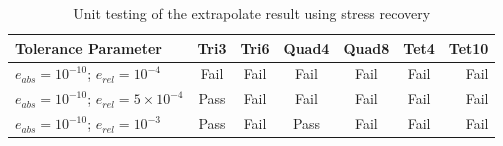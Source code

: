\begin{table} 		
	\caption{Unit testing of the extrapolate result using stress recovery}
	\label{tab: SRTesting}
	\begin{tabular}{l*{5}{c}r} 
		
		Tolerance Parameter    & Tri3 & Tri6 & Quad4 & Quad8 & Tet4  & Tet10  \\
		\hline
		$e_{abs}=10^{-10}$; $e_{rel}=10^{-4}$ & Fail & Fail & Fail & Fail & Fail & Fail   \\
		$e_{abs}=10^{-10}$; $e_{rel}=5\times10^{-4}$&  Pass& Fail & Fail & Fail & Fail &  Fail  \\
		$e_{abs}=10^{-10}$; $e_{rel}=10^{-3}$ & Pass & Fail & Pass & Fail &  Fail & Fail   \\
		\hline
	\end{tabular}
\end{table}

